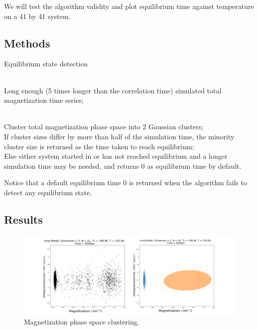 \documentclass[%
showkeys,
bibnotes,
amsmath,amssymb,
floatfix,
]{revtex4-1}
\begin{document}
We will test the algorithm validity and plot equilibrium time against temperature on a 41 by 41 system. 





\subsection{\label{sec:equi_time:method}Methods}

\begin{algorithm}[H]
	\caption{Equilibrium state detection}
	\label{alg:equilibrium_detection}
	\begin{algorithmic}
		\REQUIRE ~~\\
		
		Long enough (5 times longer than the correlation time) simulated total magnetization time series;\\
		\label{code:equi_detect:long_simulation}
		
		\ENSURE ~~\\
		Cluster total magnetization phase space into 2 Gaussian clusters;\\
		\label{code:equi_detect:gaussian_cluster}
		If cluster sizes differ by more than half of the simulation time, the minority cluster size is returned as the time taken to reach equilibrium;\\
		Else either system started in or has not reached equilibrium and a longer simulation time may be needed, and returns 0 as equilibrium time by default.
		\label{code:equi_detect:size_difference}
	\end{algorithmic}
\end{algorithm}

Notice that a default equilibrium time 0 is returned when the algorithm fails to detect any equilibrium state.

\subsection{\label{sec:equi_time:results}Results}

\begin{figure}[H] \centering
	\includegraphics[width=1.1\textwidth]{../figures/equi_time_phasespace}
	\caption{\label{fig:equi_time_phasespace} Magnetization phase space clustering.}
\end{figure}
\end{document}
